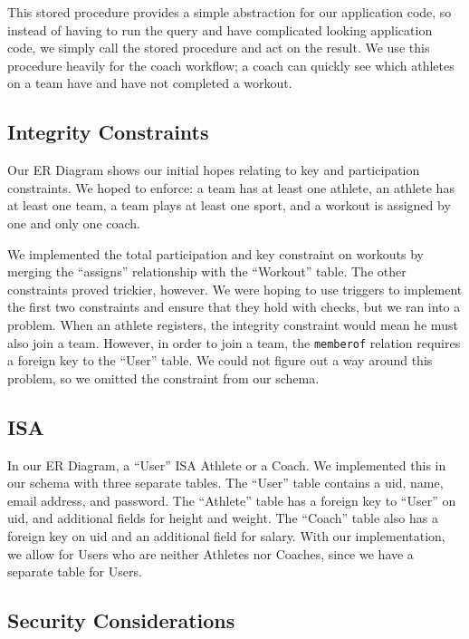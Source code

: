 \documentclass{article}
\begin{document}
This stored procedure provides a simple abstraction for our application code,
so instead of having to run the query and have complicated looking application code,
we simply call the stored procedure and act on the result. We use this 
procedure heavily for the coach workflow; a coach can quickly see which athletes
on a team have and have not completed a workout.

\subsection*{Integrity Constraints}

Our ER Diagram shows our initial hopes relating to key and participation constraints. 
We hoped to enforce: a team has at least one athlete, an athlete has at least one team,
a team plays at least one sport, and a workout is assigned by one and only one coach. 

We implemented the total participation and key constraint on workouts by merging the 
``assigns'' relationship with the ``Workout'' table. The other constraints proved 
trickier, however. We were hoping to use triggers to implement the first two 
constraints and ensure that they hold with checks, but we ran into a problem. 
When an athlete registers, the integrity constraint would mean he must also join 
a team. However, in order to join a team, the {\tt memberof} relation requires a 
foreign key to the ``User'' table. We could not figure out a way around this problem,
so we omitted the constraint from our schema. 

\subsection*{ISA}

In our ER Diagram, a ``User'' ISA Athlete or a Coach. We implemented this in our
schema with three separate tables. The ``User'' table contains a uid, name,
email address, and password. The ``Athlete'' table has a foreign key to ``User''
on uid, and additional fields for height and weight. The ``Coach'' table also
has a foreign key on uid and an additional field for salary. With our implementation,
we allow for Users who are neither Athletes nor Coaches, since we have a separate
table for Users.

\subsection*{Security Considerations}
\end{document}
